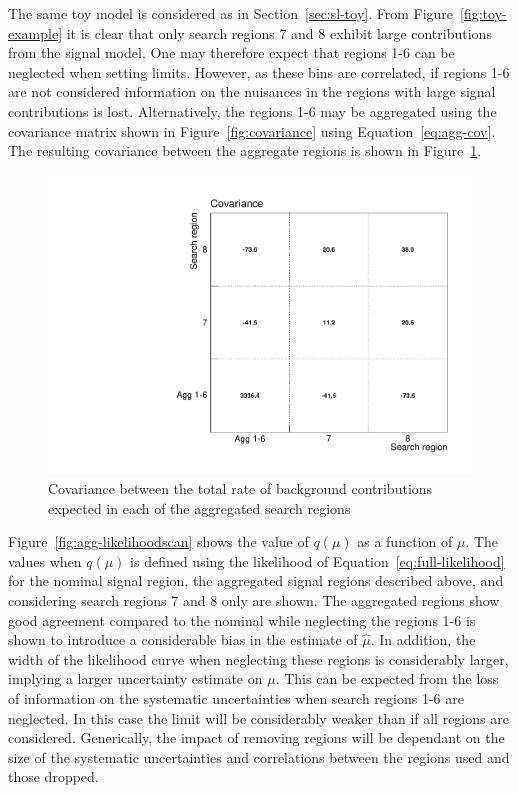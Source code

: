 The same toy model is considered as in Section~\ref{sec:sl-toy}. From Figure~\ref{fig:toy-example}
it is clear that only search regions 7 and 8 exhibit large contributions from the signal
model. One may therefore expect that regions 1-6 can be neglected when setting limits. 
However, as these bins are correlated, if regions 1-6 are not considered information 
on the nuisances in the regions with large signal contributions is lost. 
Alternatively, the regions 1-6 may be aggregated using the covariance matrix shown in 
Figure~\ref{fig:covariance} using Equation~\ref{eq:agg-cov}. The resulting covariance
between the aggregate regions is shown in Figure~\ref{fig:agg-covariance}.

\begin{figure}[hbt]
  \begin{center} 
   \includegraphics[width=1.5\cmsFigWidth]{figures/agg_htsearch_covariance.pdf}
   \caption{Covariance between the total rate of background contributions expected in each of the aggregated search regions}
   \label{fig:agg-covariance} 
  \end{center}
\end{figure}

Figure~\ref{fig:agg-likelihoodscan} shows the value of $q(\mu)$ as a function of $\mu$. The values when $q(\mu)$ 
is defined using the likelihood of Equation~\ref{eq:full-likelihood} for the nominal signal region, the aggregated signal
regions described above, and considering search regions 7 and 8 only are shown. The aggregated regions show
good agreement compared to the nominal while neglecting the regions 1-6 is shown to introduce a considerable
bias in the estimate of $\hat{\mu}$. In addition, the width of the likelihood curve when neglecting these regions is considerably
larger, implying a larger uncertainty estimate on $\mu$. This can be expected from the loss of information on
the systematic uncertainties when search regions 1-6 are neglected. In this case the limit will be considerably
weaker than if all regions are considered. Generically, the impact of removing regions
will be dependant on the size of the systematic uncertainties and correlations between the regions used and those
dropped.

